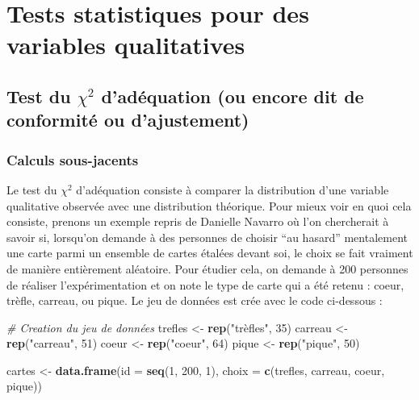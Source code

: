 \documentclass[
  french,
]{book}
\newenvironment{Shaded}{\begin{snugshade}}{\end{snugshade}}
\newcommand{\CommentTok}[1]{\textcolor[rgb]{0.56,0.35,0.01}{\textit{#1}}}
\newcommand{\DataTypeTok}[1]{\textcolor[rgb]{0.13,0.29,0.53}{#1}}
\newcommand{\DecValTok}[1]{\textcolor[rgb]{0.00,0.00,0.81}{#1}}
\newcommand{\KeywordTok}[1]{\textcolor[rgb]{0.13,0.29,0.53}{\textbf{#1}}}
\newcommand{\NormalTok}[1]{#1}
\newcommand{\StringTok}[1]{\textcolor[rgb]{0.31,0.60,0.02}{#1}}
\begin{document}
\hypertarget{tests-statistiques-pour-des-variables-qualitatives}{%
\chapter{Tests statistiques pour des variables qualitatives}\label{tests-statistiques-pour-des-variables-qualitatives}}

\hypertarget{test-du-chi2-daduxe9quation-ou-encore-dit-de-conformituxe9-ou-dajustement}{%
\section{\texorpdfstring{Test du \(\chi^2\) d'adéquation (ou encore dit de conformité ou d'ajustement)}{Test du \textbackslash chi\^{}2 d'adéquation (ou encore dit de conformité ou d'ajustement)}}\label{test-du-chi2-daduxe9quation-ou-encore-dit-de-conformituxe9-ou-dajustement}}

\hypertarget{calculs-sous-jacents}{%
\subsection{Calculs sous-jacents}\label{calculs-sous-jacents}}

Le test du \(\chi^2\) d'adéquation consiste à comparer la distribution d'une variable qualitative observée avec une distribution théorique. Pour mieux voir en quoi cela consiste, prenons un exemple repris de Danielle Navarro \autocite*{navarroLearningStatistics2018} où l'on chercherait à savoir si, lorsqu'on demande à des personnes de choisir \enquote{au hasard} mentalement une carte parmi un ensemble de cartes étalées devant soi, le choix se fait vraiment de manière entièrement aléatoire. Pour étudier cela, on demande à 200 personnes de réaliser l'expérimentation et on note le type de carte qui a été retenu : coeur, trèfle, carreau, ou pique. Le jeu de données est crée avec le code ci-dessous :

\begin{Shaded}
\begin{Highlighting}[]
\CommentTok{# Creation du jeu de données}
\NormalTok{trefles <-}\StringTok{ }\KeywordTok{rep}\NormalTok{(}\StringTok{"trèfles"}\NormalTok{, }\DecValTok{35}\NormalTok{)}
\NormalTok{carreau <-}\StringTok{ }\KeywordTok{rep}\NormalTok{(}\StringTok{"carreau"}\NormalTok{, }\DecValTok{51}\NormalTok{)}
\NormalTok{coeur <-}\StringTok{ }\KeywordTok{rep}\NormalTok{(}\StringTok{"coeur"}\NormalTok{, }\DecValTok{64}\NormalTok{)}
\NormalTok{pique <-}\StringTok{ }\KeywordTok{rep}\NormalTok{(}\StringTok{"pique"}\NormalTok{, }\DecValTok{50}\NormalTok{)}

\NormalTok{cartes <-}\StringTok{ }\KeywordTok{data.frame}\NormalTok{(}\DataTypeTok{id =} \KeywordTok{seq}\NormalTok{(}\DecValTok{1}\NormalTok{, }\DecValTok{200}\NormalTok{, }\DecValTok{1}\NormalTok{), }\DataTypeTok{choix =} \KeywordTok{c}\NormalTok{(trefles, carreau, coeur, pique))}
\end{Highlighting}
\end{Shaded}
\end{document}
